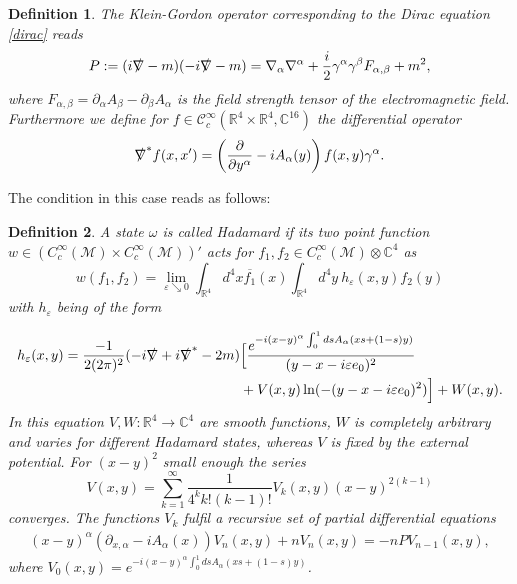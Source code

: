 \documentclass[a4paper,11pt]{article}
\newtheorem{de}{Definition}
\begin{document}
\begin{de}
The Klein-Gordon operator corresponding to the Dirac equation \eqref{dirac} reads
\begin{equation}
P:=(i\slashed{\nabla}-m)(-i\slashed{\nabla}-m)=\nabla_\alpha \nabla^\alpha + \frac{i}{2} \gamma^\alpha \gamma^\beta F_{\alpha,\beta} +m^2,
\end{equation}
where \(F_{\alpha,\beta}=\partial_\alpha A_\beta - \partial_\beta A_\alpha\) is the field strength tensor of the electromagnetic field. Furthermore we 
define for \(f\in \mathcal{C}_c^\infty(\mathbb{R}^4\times \mathbb{R}^4,\mathbb{C}^{16})\) the differential operator
\begin{equation}
\slashed{\nabla}^* f(x,x')=\left(\frac{\partial}{\partial y^\alpha} - i A_\alpha(y)\right)f(x,y)\gamma^\alpha.
\end{equation}
\end{de}


The condition in this case reads as follows: 

\begin{de}
A state \(\omega\) is called Hadamard if its two point function \(w\in (C_c^\infty(\mathcal{M})\times C_c^\infty(\mathcal{M}))'\) 
acts for \(f_1,f_2\in C_c^\infty(\mathcal{M})\otimes \mathbb{C}^4\) as 
\begin{equation}
w(f_1,f_2)=\lim_{\varepsilon\searrow 0} \int_{\mathbb{R}^4}d^4 x \overline{f_1}(x) \int_{\mathbb{R}^4} d^4y ~h_\varepsilon(x,y) f_2(y)
\end{equation}
with \(h_\varepsilon\) being of the form

\begin{align}\nonumber
h_\varepsilon (x,y)=\frac{-1}{2(2\pi)^2}(-i \slashed{\nabla} + i \slashed{\nabla}^\ast -2m)
&\Big[\frac{e^{-i (x-y)^\alpha\int_0^1 ds A_\alpha (x s + (1-s)y)}}{ (y-x-i \varepsilon e_0)^2}\\\label{def:hadamard}
&+V(x,y) \ln (-(y-x-i \varepsilon e_0)^2)\Big]+W(x,y).
\end{align}
%
%
In this equation \(V,W:\mathbb{R}^4\rightarrow \mathbb{C}^4\) are smooth functions, \(W\) is completely arbitrary and varies for
different Hadamard states, whereas \(V\) is fixed by the external potential. For \((x-y)^2\) small enough the series
\begin{equation}
V(x,y)=\sum_{k=1}^\infty \frac{1}{ 4^{k} k!(k-1)!} V_k(x,y) (x-y)^{2(k-1)}
\end{equation}
converges.\cite{something...}  The functions \(V_k\) fulfil a recursive set of partial differential equations
\begin{align}\label{Hadamard recursive equ.}
(x-y)^\alpha (\partial_{x,\alpha}-i A_\alpha(x)) V_{n}(x,y) + n V_{n}(x,y)=-n P V_{n-1}(x,y),
\end{align}
where \(V_{0}(x,y)=e^{-i (x-y)^\alpha\int_0^1 ds A_\alpha (x s + (1-s)y)}\).
\end{de}
\end{document}
